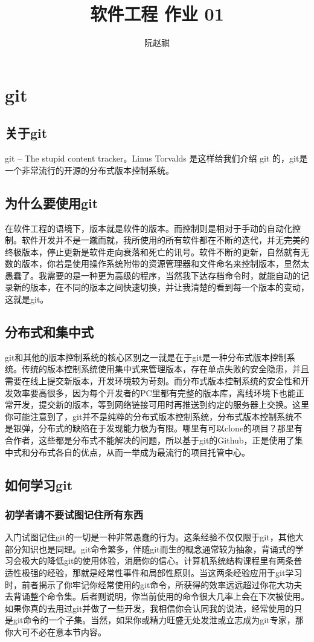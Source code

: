 \documentclass{article}
\title{软件工程 作业 01}
\author{阮赵祺}
\begin{document}
	
	\maketitle
	\section{git}
	\subsection{关于git}
	git --	The stupid content tracker。Linus Torvalds 是这样给我们介绍 git 的，git是一个非常流行的开源的分布式版本控制系统。
	\subsection{为什么要使用git}
	在软件工程的语境下，版本就是软件的版本。而控制则是相对于手动的自动化控制。软件开发并不是一蹴而就，我所使用的所有软件都在不断的迭代，并无完美的终极版本，停止更新是软件走向衰落和死亡的讯号。软件不断的更新，自然就有无数的版本，你若是使用操作系统附带的资源管理器和文件命名来控制版本，显然太愚蠢了。我需要的是一种更为高级的程序，当然我下达存档命令时，就能自动的记录新的版本，在不同的版本之间快速切换，并让我清楚的看到每一个版本的变动，这就是git。
	\subsection{分布式和集中式}
	git和其他的版本控制系统的核心区别之一就是在于git是一种分布式版本控制系统。传统的版本控制系统使用集中式来管理版本，存在单点失败的安全隐患，并且需要在线上提交新版本，开发环境较为苛刻。而分布式版本控制系统的安全性和开发效率要高很多，因为每个开发者的PC里都有完整的版本库，离线环境下也能正常开发，提交新的版本，等到网络链接可用时再推送到约定的服务器上交换。这里你可能注意到了，git并不是纯粹的分布式版本控制系统，分布式版本控制系统不是银弹，分布式的缺陷在于发现能力极为有限。哪里有可以clone的项目？那里有合作者，这些都是分布式不能解决的问题，所以基于git的Github，正是使用了集中式和分布式各自的优点，从而一举成为最流行的项目托管中心。
	\subsection{如何学习git}
	\subsubsection{初学者请不要试图记住所有东西}
	入门试图记住git的一切是一种非常愚蠢的行为。这条经验不仅仅限于git，其他大部分知识也是同理。git命令繁多，伴随git而生的概念通常较为抽象，背诵式的学习会极大的降低git的使用体验，消磨你的信心。计算机系统结构课程里有两条普适性极强的经验，那就是经常性事件和局部性原则。当这两条经验应用于git学习时，前者揭示了你牢记你经常使用的git命令，所获得的效率远远超过你花大功夫去背诵整个命令集。后者则说明，你当前使用的命令很大几率上会在下次被使用。如果你真的去用过git并做了一些开发，我相信你会认同我的说法，经常使用的只是git命令的一个子集。当然，如果你或精力旺盛无处发泄或立志成为git专家，那你大可不必在意本节内容。
\end{document}
